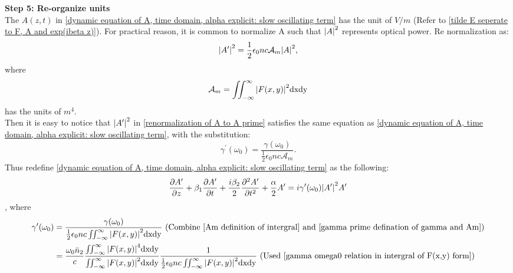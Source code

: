 \documentclass[12pt]{extarticle}
\numberwithin{equation}{section}
\numberwithin{figure}{section}
\numberwithin{table}{section}
\newcommand{\<}{\langle}
\renewcommand{\>}{\rangle}
\theoremstyle{definition}
\newcommand{\SubItem}[1]{
    {\setlength\itemindent{15pt} \item[-] #1}
}
\begin{document}
\begin{itemize}
            \SubItem{\textbf{Step 5: Re-organize units}\\
            The $A(z,t)$ in \autoref{dynamic equation of A, time domain, alpha explicit: slow oscillating term} has the unit of $V/m$ (Refer to \autoref{tilde E seperate to F, A and exp(ibeta z)}). For practical reason, it is common to normalize A such that $\abs{A}^2$ represents optical power. Re normalization as:
            \begin{equation}
                \abs{A^\prime}^2=\frac{1}{2}\epsilon_0 n c \mathcal{A}_m\abs{A}^2,
                \label{renormalization of A to A prime}
            \end{equation}
            where
            \begin{equation}
                \mathcal{A}_m = \iint_{-\infty}^\infty \abs{F(x,y)}^2 \mathrm{dxdy}
                \label{Am definition of intergral}
            \end{equation}
            has the units of $m^4$.\\
            Then it is easy to notice that $\abs{A^\prime}^2$ in \autoref{renormalization of A to A prime} satisfies the same equation as \autoref{dynamic equation of A, time domain, alpha explicit: slow oscillating term}, with the substitution:
            \begin{equation}
                \gamma^\prime(\omega_0)= \frac{\gamma(\omega_0)}{\frac{1}{2}\epsilon_0 n c \mathcal{A}_m}.
                \label{gamma prime defination of gamma and Am}
            \end{equation}
            Thus redefine \autoref{dynamic equation of A, time domain, alpha explicit: slow oscillating term} as the following:
                \begin{equation}
                    \pdv{A^\prime}{z}+\beta_1\pdv{A^\prime}{t}+\frac{i\beta_2}{2}\pdv[2]{A^\prime}{t}+\frac{\alpha}{2}A^\prime=i\gamma^\prime(\omega_0) \abs{A^\prime}^2 A^\prime
                    \label{pulse propagation function without Ramann}
                \end{equation}
                , where
                \begin{equation}
                \begin{split}
                    \gamma^\prime(\omega_0)&= \frac{\gamma(\omega_0)}{\frac{1}{2}\epsilon_0 n c \iint_{-\infty}^\infty \abs{F(x,y)}^2 \mathrm{dxdy}} \mbox{ (Combine \autoref{Am definition of intergral} and \autoref{gamma prime defination of gamma and Am})}\\
                    &=\frac{\omega_0\Bar{n}_2}{c} \frac{\iint_{-\infty}^\infty  \abs{F(x,y)}^4 \mathrm{dxdy}}{\iint_{-\infty}^\infty \abs{F(x,y)}^2 \mathrm{dxdy}} \frac{1}{\frac{1}{2}\epsilon_0 n c \iint_{-\infty}^\infty \abs{F(x,y)}^2 \mathrm{dxdy}} \mbox{ (Used \autoref{gamma omega0 relation in intergral of F(x,y) form})}\\

\end{split}
\end{equation}}
\end{itemize}
\end{document}
